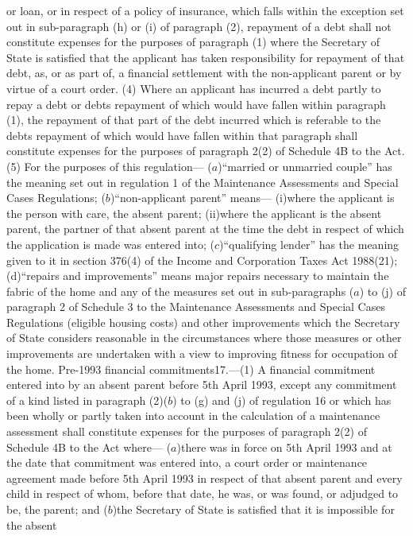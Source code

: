 \documentclass[a4paper]{article}
\begin{document}
or loan, or in respect of a policy of insurance, which falls within the
exception set out in sub-paragraph (h) or (i) of paragraph (2), repayment of a
debt shall not constitute expenses for the purposes of paragraph (1) where the
Secretary of State is satisfied that the applicant has taken responsibility for
repayment of that debt, as, or as part of, a financial settlement with the
non-applicant parent or by virtue of a court order.
(4) Where an applicant has incurred a debt partly to repay a debt or debts
repayment of which would have fallen within paragraph (1), the repayment of that
part of the debt incurred which is referable to the debts repayment of which
would have fallen within that paragraph shall constitute expenses for the
purposes of paragraph 2(2) of Schedule 4B to the Act.
(5) For the purposes of this regulation—
($a$)“married or unmarried couple” has the meaning set out in regulation 1 of the
Maintenance Assessments and Special Cases Regulations;
($b$)“non-applicant parent” means—
(i)where the applicant is the person with care, the absent parent;
(ii)where the applicant is the absent parent, the partner of that absent parent
at the time the debt in respect of which the application is made was entered
into;
($c$)“qualifying lender” has the meaning given to it in section 376(4) of the
Income and Corporation Taxes Act 1988(21);
(d)“repairs and improvements” means major repairs necessary to maintain the
fabric of the home and any of the measures set out in sub-paragraphs ($a$) to (j)
of paragraph 2 of Schedule 3 to the Maintenance Assessments and Special Cases
Regulations (eligible housing costs) and other improvements which the Secretary
of State considers reasonable in the circumstances where those measures or other
improvements are undertaken with a view to improving fitness for occupation of
the home.
Pre-1993 financial commitments17.—(1) A financial commitment entered into by an
absent parent before 5th April 1993, except any commitment of a kind listed in
paragraph (2)($b$) to (g) and (j) of regulation 16 or which has been wholly or
partly taken into account in the calculation of a maintenance assessment shall
constitute expenses for the purposes of paragraph 2(2) of Schedule 4B to the Act
where—
($a$)there was in force on 5th April 1993 and at the date that commitment was
entered into, a court order or maintenance agreement made before 5th April 1993
in respect of that absent parent and every child in respect of whom, before that
date, he was, or was found, or adjudged to be, the parent; and
($b$)the Secretary of State is satisfied that it is impossible for the absent
\end{document}
